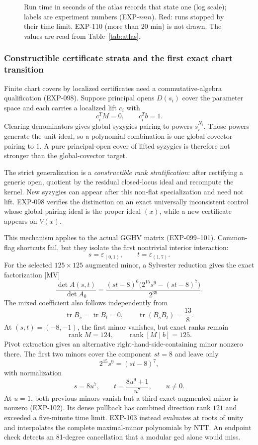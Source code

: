 \documentclass[11pt]{article}
\theoremstyle{remark}
\begin{document}
\begin{figure}[t]
\centering

\caption{Run time in seconds of the atlas records that state one (log scale); labels are experiment numbers (EXP-$nnn$). Red: runs stopped by their time limit. EXP-110 (more than $20$ min) is not drawn. The values are read from Table~\ref{tab:atlas}.}\label{fig:times}
\end{figure}

\begin{landscape}

\end{landscape}
\subsubsection{Constructible certificate strata and the first exact chart transition}

Finite chart covers by localized certificates need a commutative-algebra
qualification \mbox{(EXP-098)}. Suppose principal opens \(D(s_i)\)
cover the parameter space and each carries a localized lift \(c_i\) with
\[
 c_i^TM=0,\qquad c_i^Tb=1.
\]
Clearing denominators gives global syzygies pairing to powers \(s_i^{N_i}\).
Those powers generate the unit ideal, so a polynomial combination is one
global covector pairing to \(1\). A pure principal-open cover of lifted
syzygies is therefore not stronger than the global-covector target.

The strict generalization is a \emph{constructible rank stratification}: after
certifying a generic open, quotient by the residual closed-locus ideal and
recompute the kernel. New syzygies can appear after this non-flat
specialization and need not lift. EXP-098 verifies the distinction on an exact
universally inconsistent control whose global pairing ideal is the proper
ideal \((x)\), while a new certificate appears on \(V(x)\).

This mechanism applies to the actual GGHV matrix (EXP-099--101). Common-flag
shortcuts fail, but they isolate the first nontrivial interior interaction:
\[
 s=\varepsilon_{(0,1)},\qquad t=\varepsilon_{(1,7)}.
\]
For the selected \(125\times125\) augmented minor, a Sylvester reduction gives
the exact factorization [MV]
\[
 \frac{\det A(s,t)}{\det A_0}
 =
 \frac{(st-8)^6\bigl(2^{15}s^9-(st-8)^7\bigr)}{2^{39}}.
\]
The mixed coefficient also follows independently from
\[
 \operatorname{tr}B_s=\operatorname{tr}B_t=0,\qquad
 \operatorname{tr}(B_sB_t)=\frac{13}{8}.
\]
At \((s,t)=(-8,-1)\), the first minor vanishes, but exact ranks remain
\[
 \operatorname{rank}M=124,\qquad
 \operatorname{rank}[M\mid b]=125.
\]
Pivot extraction gives an alternative right-hand-side-containing minor
nonzero there. The first two minors cover the component \(st=8\) and leave
only
\[
 2^{15}s^9=(st-8)^7,
\]
with normalization
\[
 s=8u^7,\qquad t=\frac{8u^9+1}{u^7},\qquad u\ne0.
\]
At \(u=1\), both previous minors vanish but a third exact augmented minor is
nonzero \mbox{(EXP-102)}. Its dense pullback has combined direction rank \(121\) and
exceeded a five-minute time limit. \mbox{EXP-103} instead evaluates at roots of unity
and interpolates the complete maximal-minor polynomials by NTT. An endpoint
check detects an 81-degree cancellation that a modular gcd alone would miss.
\end{document}
